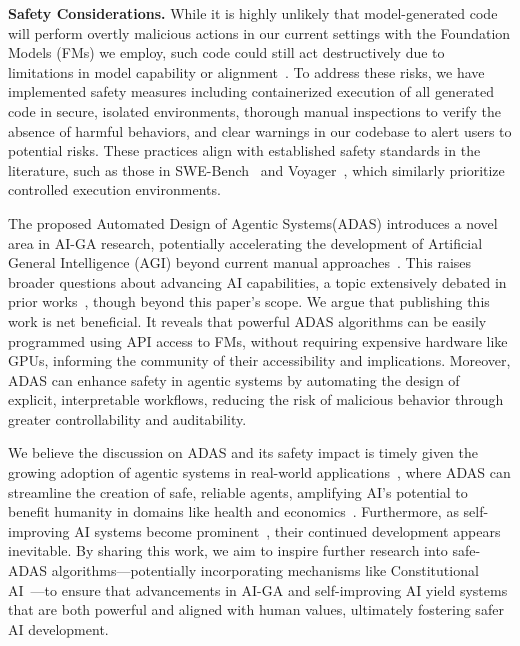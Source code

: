 \documentclass{article}
\newcommand{\problemlong}{Automated Design of Agentic Systems\xspace}
\newcommand{\problem}{ADAS\xspace}
\begin{document}
\noindent\textbf{Safety Considerations.}\hspace{0.5em} While it is highly unlikely that model-generated code will perform overtly malicious actions in our current settings with the Foundation Models (FMs) we employ, such code could still act destructively due to limitations in model capability or alignment~\citep{rokon2020sourcefinder,chen2021evaluating}. To address these risks, we have implemented safety measures including containerized execution of all generated code in secure, isolated environments, thorough manual inspections to verify the absence of harmful behaviors, and clear warnings in our codebase to alert users to potential risks. These practices align with established safety standards in the literature, such as those in SWE-Bench~\citep{jimenez2024swebench} and Voyager~\citep{wang2023voyager}, which similarly prioritize controlled execution environments.

The proposed \problemlong (\problem) introduces a novel area in AI-GA research, potentially accelerating the development of Artificial General Intelligence (AGI) beyond current manual approaches~\citep{clune2019aigas}. This raises broader questions about advancing AI capabilities, a topic extensively debated in prior works~\citep{clune2019aigas,ecoffet2020open,bostrom2002a,yudkowsky2008artificial,bengio2024managing}, though beyond this paper’s scope. We argue that publishing this work is net beneficial. It reveals that powerful \problem algorithms can be easily programmed using API access to FMs, without requiring expensive hardware like GPUs, informing the community of their accessibility and implications. Moreover, \problem can enhance safety in agentic systems by automating the design of explicit, interpretable workflows, reducing the risk of malicious behavior through greater controllability and auditability.

We believe the discussion on \problem and its safety impact is timely given the growing adoption of agentic systems in real-world applications~\citep{turow2024}, where \problem can streamline the creation of safe, reliable agents, amplifying AI’s potential to benefit humanity in domains like health and economics~\citep{amodei2024}. Furthermore, as self-improving AI systems become prominent~\citep{clune2019aigas,fernando2024promptbreeder,lu2024discopop,zelikman2022star}, their continued development appears inevitable. By sharing this work, we aim to inspire further research into safe-\problem algorithms—potentially incorporating mechanisms like Constitutional AI~\citep{bai2022constitutional}—to ensure that advancements in AI-GA and self-improving AI yield systems that are both powerful and aligned with human values, ultimately fostering safer AI development.
\end{document}
